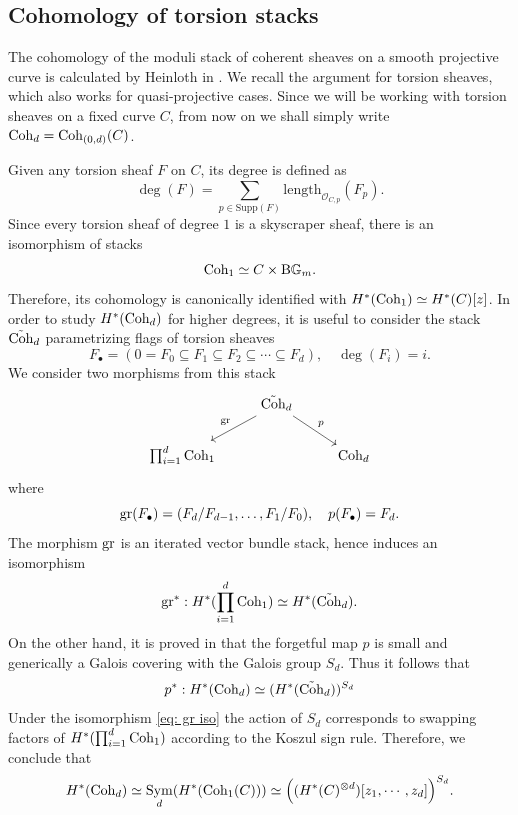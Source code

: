 \documentclass[10pt]{amsart}
\newcommand{\BGm}{\textnormal{B}\mathbb{G}_m}
\newcommand{\Coh}{\textnormal{Coh}}
\newcommand{\+}{{}^+}
\newcommand{\gr}{\textnormal{gr}}
\DeclareMathOperator{\Sym}{Sym}
\theoremstyle{definition}
\theoremstyle {definition}
\theoremstyle {definition}
\begin{document}
\subsection{Cohomology of torsion stacks}


The cohomology of the moduli stack of coherent sheaves on a smooth projective curve is calculated by Heinloth in \cite{Heinloth_curve}. We recall the argument for torsion sheaves, which also works for quasi-projective cases. Since we will be working with torsion sheaves on a fixed curve $C$, from now on we shall simply write $\Coh_d=\Coh_{(0,d)}(C)$. 

Given any torsion sheaf $F$ on $C$, its degree is defined as \[ \deg(F) = \sum_{p \in \mathrm{Supp}(F)} \mathrm{length}_{\mathcal{O}_{C,p}}(F_{p}).\] 
Since every torsion sheaf of degree $1$ is a skyscraper sheaf, there is an isomorphism of stacks
\[ \Coh_{1} \simeq C \times \BGm. \]
Therefore, its cohomology is canonically identified with $H^*(\Coh_1)\simeq H^*(C)[z]$. In order to study $H^*(\Coh_d)$ for higher degrees, it is useful to consider the stack $\tilde{\Coh}_{d}$ parametrizing flags of torsion sheaves
$$F_\bullet=(0=F_0\subseteq F_1\subseteq F_2\subseteq \cdots\subseteq F_d),\quad \deg(F_i)=i.
$$
We consider two morphisms from this stack
\[\begin{tikzcd}[ampersand replacement=\&]
	\& {\tilde{\Coh}_{d} } \\
	{\prod_{i=1}^d\Coh_{1}} \&\& {\Coh_{d}}
	\arrow["{\mathrm{gr}}"', from=1-2, to=2-1]
	\arrow["p", from=1-2, to=2-3]
\end{tikzcd}\]
where 
$$\gr(F_\bullet)=(F_{d}/F_{d-1},\dots, F_{1}/F_{0}),\quad p(F_\bullet)=F_d.
$$
The morphism $\gr$ is an iterated vector bundle stack, hence induces an isomorphism
\begin{equation}\label{eq: gr iso}
\mathrm{gr}^{*}: H^{*}(\prod_{i=1}^{d} \Coh_{1}) \simeq H^{*}(\tilde{\Coh}_{d}).
\end{equation}  
On the other hand, it is proved in \cite[Thm. 3.3.1]{laumon} that the forgetful map $p$ is small and generically a Galois covering with the Galois group $S_d$. Thus it follows that 
\begin{equation*}\label{eq: Galois iso}
p^{*}: H^{*}(\Coh_{d}) \simeq (H^{*}(\tilde{\Coh}_{d}))^{S_d}
\end{equation*} 
Under the isomorphism \eqref{eq: gr iso} the action of $S_d$ corresponds to swapping factors of $H^*(\prod_{i=1}^d \Coh_1)$ according to the Koszul sign rule. Therefore, we conclude that
\begin{equation}\label{eq: heinloth iso} 
H^{*}(\Coh_{d}) \simeq \Sym_d(H^{*}(\Coh_{1}(C))) \simeq \Big((H^{*}(C)^{\otimes d}) [z_1,\cdots,z_d]\Big)^{S_d}.
\end{equation}
\end{document}
